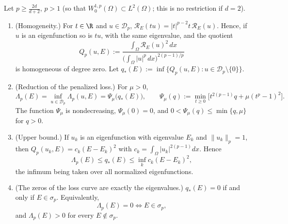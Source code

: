 \begin{proposition}\label{prop.plap}
Let $p\ge\frac{2d}{d+2}$, $p>1$ (so that $W^{1,p}_0(\Omega)\subset L^2(\Omega)$; this is
no restriction if $d=2$).
\begin{enumerate}
\item[(a)] (Homogeneity.) For $t\in\R$ and $u\in\mathcal D_p$,
$\mathcal R_E(tu)=|t|^{p-2}t\,\mathcal R_E(u)$. Hence, if $u$ is an eigenfunction so is
$tu$, with the same eigenvalue, and the quotient
\[
Q_p(u,E):=\frac{\int_\Omega\mathcal R_E(u)^2\,dx}{\big(\int_\Omega|u|^p\,dx\big)^{2(p-1)/p}}
\]
is homogeneous of degree zero. Let $q_*(E):=\inf\{Q_p(u,E)\colon u\in\mathcal D_p\setminus\{0\}\}$.
\item[(b)] (Reduction of the penalized loss.) For $\mu>0$,
\[
\Lambda_p(E)=\inf_{u\in\mathcal D_p}\Lambda_p(u,E)=\Psi_\mu\big(q_*(E)\big),\qquad
\Psi_\mu(q):=\min_{t\ge0}\Big[t^{2(p-1)}q+\mu(t^p-1)^2\Big].
\]
The function $\Psi_\mu$ is nondecreasing, $\Psi_\mu(0)=0$, and
$0<\Psi_\mu(q)\le\min\{q,\mu\}$ for $q>0$.
\item[(c)] (Upper bound.) If $u_k$ is an eigenfunction with eigenvalue $E_k$ and
$\|u_k\|_p=1$, then $Q_p(u_k,E)=c_k(E-E_k)^2$ with
$c_k=\int_\Omega|u_k|^{2(p-1)}dx$. Hence
\[
\Lambda_p(E)\le q_*(E)\le\inf_kc_k(E-E_k)^2 ,
\]
the infimum being taken over all normalized eigenfunctions.
\item[(d)] (The zeros of the loss curve are exactly the eigenvalues.)
$q_*(E)=0$ if and only if $E\in\sigma_p$. Equivalently,
\[
\Lambda_p(E)=0\iff E\in\sigma_p ,
\]
and $\Lambda_p(E)>0$ for every $E\notin\sigma_p$.
\end{enumerate}
\end{proposition}

